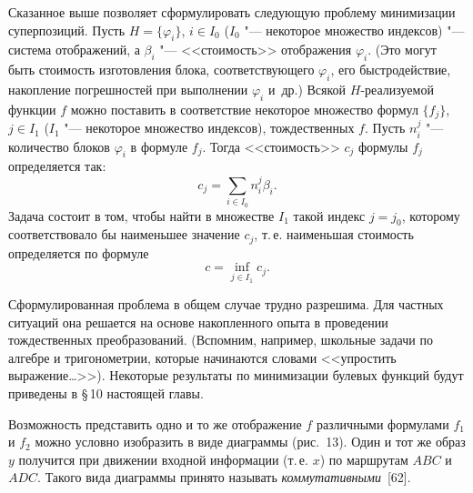 Сказанное выше позволяет сформулировать следующую проблему минимизации
суперпозиций. Пусть $H=\{\varphi_i\}$, $i\in I_0$ ($I_0$ "--- некоторое
множество индексов) "--- система отображений, а $\beta_i$ "---
<<стоимость>> отображения $\varphi_i$. (Это могут быть стоимость
изготовления блока, соответствующего $\varphi_i$, его быстродействие,
накопление погрешностей при выполнении $\varphi_i$ и~др.) Всякой
$H$-реализуемой функции $f$ можно поставить в соответствие некоторое
множество формул $\{f_j\}$, $j\in I_1$ ($I_1$ "--- некоторое множество
индексов), тождественных $f$. Пусть $n_i^j$ "--- количество блоков
$\varphi_i$ в формуле $f_j$. Тогда <<стоимость>> $c_j$ формулы $f_j$
определяется так:
\begin{equation}\tag{1.19}
c_j=\sum_{i\in I_0}n_i^j\beta_i .
\end{equation}
Задача состоит в том, чтобы найти в множестве $I_1$ такой индекс $j=j_0$,
которому соответствовало бы наименьшее значение $c_j$, т.\,е. наименьшая
стоимость определяется по формуле
\begin{equation}\tag{1.20}
c=\inf_{j\in I_1}c_j .
\end{equation}

\begin{figure}[h]
\centering
{}
\end{figure}

Сформулированная проблема в общем случае трудно разрешима. Для частных
ситуаций она решается на основе накопленного опыта в проведении
тождественных преобразований. (Вспомним, например, школьные задачи по
алгебре и тригонометрии, которые начинаются словами <<упростить
выражение\dots>>). Некоторые результаты по минимизации булевых функций
будут приведены в \S\,10 настоящей главы.

Возможность представить одно и то же отображение $f$ различными формулами
$f_1$ и $f_2$ можно условно изобразить в виде диаграммы (рис.~13). Один и
тот же образ $y$ получится при движении входной информации (т.\,е. $x$) по
маршрутам $ABC$ и $ADC$. Такого вида диаграммы принято называть
\emph{коммутативными}~[62].

